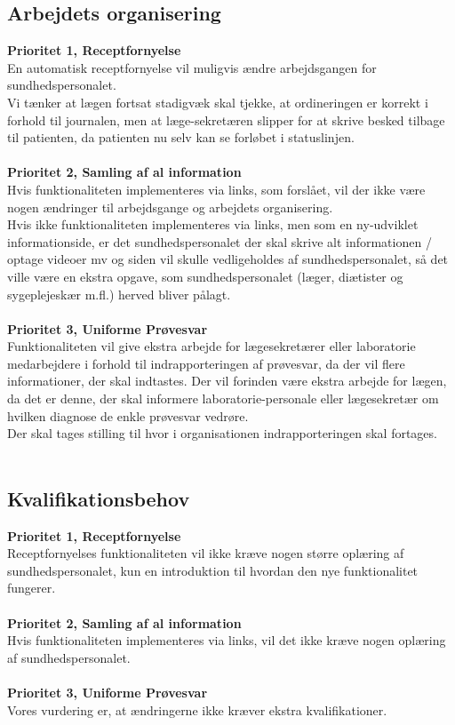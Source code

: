 \subsection{Arbejdets organisering}  
\textbf{Prioritet 1, Receptfornyelse} \\
En automatisk receptfornyelse vil muligvis ændre arbejdsgangen for sundhedspersonalet. \\ 
Vi tænker at lægen fortsat stadigvæk skal tjekke, at ordineringen er korrekt i forhold til journalen, men at læge-sekretæren slipper for at skrive besked tilbage til patienten, da patienten nu selv kan se forløbet i statuslinjen.
%
\\\\
\textbf{Prioritet 2, Samling af al information} \\
Hvis funktionaliteten implementeres via links, som forslået, vil der ikke være nogen ændringer til arbejdsgange og arbejdets organisering. \\
Hvis ikke funktionaliteten implementeres via links, men som en ny-udviklet informationside, er det sundhedspersonalet der skal skrive alt informationen / optage videoer mv og siden vil skulle vedligeholdes af sundhedspersonalet, så det ville være en ekstra opgave, som sundhedspersonalet (læger, diætister og sygeplejeskær m.fl.) herved bliver pålagt.
\\\\
\textbf{Prioritet 3, Uniforme Prøvesvar} \\
Funktionaliteten vil give ekstra arbejde for lægesekretærer eller laboratorie medarbejdere i forhold til indrapporteringen af prøvesvar, da der vil flere informationer, der skal indtastes. Der vil forinden være ekstra arbejde for lægen, da det er denne, der skal informere laboratorie-personale eller lægesekretær om hvilken diagnose de enkle prøvesvar vedrøre.\\
Der skal tages stilling til hvor i organisationen indrapporteringen skal fortages.
\\\\
\subsection{Kvalifikationsbehov}
\textbf{Prioritet 1, Receptfornyelse} \\
Receptfornyelses funktionaliteten vil ikke kræve nogen større oplæring af sundhedspersonalet, kun en introduktion til hvordan den nye funktionalitet fungerer.
\\\\
\textbf{Prioritet 2, Samling af al information} \\
Hvis funktionaliteten implementeres via links, vil det ikke kræve nogen oplæring af sundhedspersonalet.
\\\\
\textbf{Prioritet 3, Uniforme Prøvesvar} \\
Vores vurdering er, at ændringerne ikke kræver ekstra kvalifikationer.